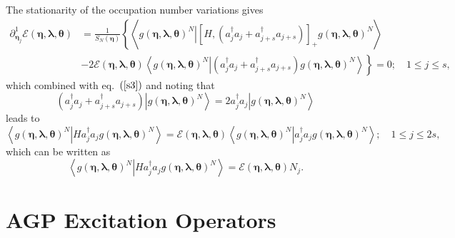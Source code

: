 \documentclass[aps,preprint]{revtex4}%
\begin{document}
The stationarity of the occupation number variations gives
\begin{align}
\partial_{\bm{\eta}_{j}}^{1}\mathcal{E}\left(
\bm{\eta},\bm{\lambda},\bm{\theta}\right)   &  =\frac{1}{S_{N}\left(
\bm{\eta}\right)  }\left\{  \left\langle \left.  g\left(
\bm{\eta },\bm{\lambda},\bm{\theta}\right)  ^{N}\right\vert \left[  H,\left(
a_{j}^{\dagger}a_{j}+a_{j+s}^{\dagger}a_{j+s}\right)  \right]  _{+}g\left(
\bm{\eta},\bm{\lambda},\bm{\theta}\right)  ^{N}\right\rangle \right.
\nonumber\\
&  -\left.  2\mathcal{E}\left(  \bm{\eta},\bm{\lambda},\bm{\theta }\right)
\left\langle \left.  g\left(  \bm{\eta},\bm{\lambda },\bm{\theta}\right)
^{N}\right\vert \left(  a_{j}^{\dagger}a_{j}+a_{j+s}^{\dagger}a_{j+s}\right)
g\left(  \bm{\eta},\bm{\lambda },\bm{\theta}\right)  ^{N}\right\rangle
\right\}  =0;\quad1\leq j\leq s,
\end{align}
which combined with eq.\ $\left(  \ref{s3}\right)  $ and noting that
\begin{equation}
\left(  a_{j}^{\dagger}a_{j}+a_{j+s}^{\dagger}a_{j+s}\right)  \left\vert
g\left(  \bm{\eta},\bm{\lambda},\bm{\theta}\right)  ^{N}\right\rangle
=2a_{j}^{\dagger}a_{j}\left\vert g\left(
\bm{\eta },\bm{\lambda},\bm{\theta}\right)  ^{N}\right\rangle
\end{equation}
leads to
\begin{equation}
\left\langle \left.  g\left(  \bm{\eta},\bm{\lambda},\bm{\theta }\right)
^{N}\right\vert Ha_{j}^{\dagger}a_{j}g\left(
\bm{\eta },\bm{\lambda},\bm{\theta}\right)  ^{N}\right\rangle =\mathcal{E}%
\left(  \bm{\eta},\bm{\lambda},\bm{\theta}\right)  \left\langle \left.
g\left(  \bm{\eta},\bm{\lambda},\bm{\theta}\right)  ^{N}\right\vert
a_{j}^{\dagger}a_{j}g\left(  \bm{\eta},\bm{\lambda },\bm{\theta}\right)
^{N}\right\rangle ;\quad1\leq j\leq2s,
\end{equation}
which can be written as
\begin{equation}
\left\langle \left.  g\left(  \bm{\eta},\bm{\lambda},\bm{\theta }\right)
^{N}\right\vert Ha_{j}^{\dagger}a_{j}g\left(
\bm{\eta },\bm{\lambda},\bm{\theta}\right)  ^{N}\right\rangle =\mathcal{E}%
\left(  \bm{\eta},\bm{\lambda},\bm{\theta}\right)  N_{j}.
\end{equation}


\section{AGP Excitation Operators\label{q_op}}
\end{document}
